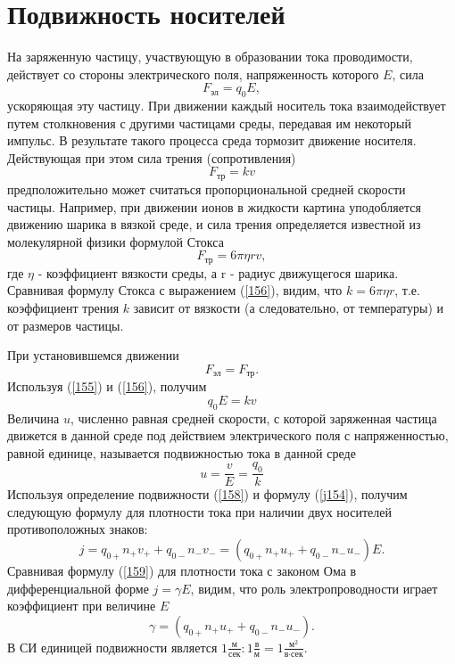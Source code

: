 \documentclass[a4paper,10pt]{book}
\begin{document}
\section{Подвижность носителей}
На заряженную частицу, участвующую в образовании тока проводимости, действует со стороны электрического поля, напряженность которого $E$, сила
\begin{equation}\label{155}
 F_\text{эл} = q_0E,
\end{equation}
ускоряющая эту частицу. При движении каждый носитель тока взаимодействует путем столкновения с другими частицами среды, передавая им некоторый импульс. В результате такого процесса среда тормозит движение носителя. Действующая при этом сила трения (сопротивления)
\begin{equation}\label{156}
 F_\text{тр} = kv
\end{equation}
предположительно может считаться пропорциональной средней скорости частицы. Например, при движении ионов в жидкости картина уподобляется движению шарика в вязкой среде, и сила трения определяется известной из молекулярной физики формулой Стокса
\begin{equation}
 F_\text{тр} = 6\pi \eta r v, 
\end{equation}
где $\eta$ - коэффициент вязкости среды, а r - радиус движущегося шарика.
Сравнивая формулу Стокса с выражением (\ref{156}), видим, что $k = 6\pi \eta r$, т.е. коэффициент трения $k$ зависит от вязкости (а следовательно, 
от температуры) и от размеров частицы.

При установившемся движении 
\begin{equation*}
 F_\text{эл} = F_\text{тр}.
\end{equation*}
Используя (\ref{155}) и (\ref{156}), получим 
\begin{equation}\label{157}
 q_0E = kv
\end{equation}
Величина $u$, численно равная средней скорости, с которой заряженная частица движется в данной среде под действием электрического поля с 
напряженностью, равной единице, называется подвижностью тока в данной среде 
\begin{equation}\label{158}
 u = \frac{v}{E} = \frac{q_0}{k}
\end{equation}
Используя определение подвижности (\ref{158}) и формулу (\ref{j154}), получим следующую формулу для плотности тока при наличии двух носителей
противоположных знаков:
\begin{equation}\label{159}
 j = q_{0+}n_+v_+ + q_{0-}n_-v_- = (q_{0+}n_+u_+ + q_{0-}n_-u_-)E.
\end{equation}
Сравнивая формулу (\ref{159}) для плотности тока с законом Ома в дифференциальной форме $j = \gamma E$, видим, что роль электропроводности играет
коэффициент при величине $E$
\begin{equation}\label{1510}
 \gamma = (q_{0+}n_+u_+ + q_{0-}n_-u_-).
\end{equation}
В СИ единицей подвижности является $1\frac{\text{м}}{\text{сек}}:1\frac{\text{в}}{\text{м}} = 1\frac{\text{м}^2}{\text{в}\cdot\text{сек}}$.
\end{document}
